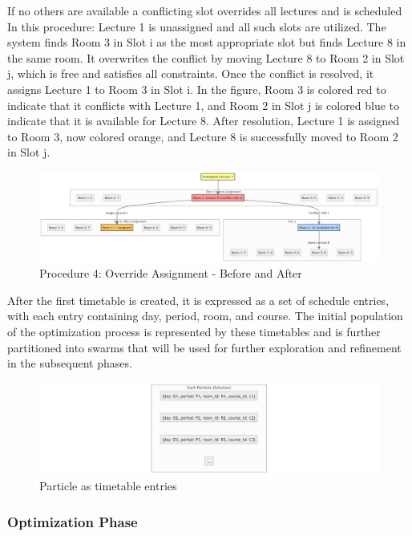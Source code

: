\begin{itemize}
    If no others are available a conflicting slot overrides all lectures and is scheduled In this procedure: Lecture 1 is unassigned and all such slots are utilized. The system finds Room 3 in Slot i as the most appropriate slot but finds Lecture 8 in the same room. It overwrites the conflict by moving Lecture 8 to Room 2 in Slot j, which is free and satisfies all constraints. Once the conflict is resolved, it assigns Lecture 1 to Room 3 in Slot i. In the figure, Room 3 is colored red to indicate that it conflicts with Lecture 1, and Room 2 in Slot j is colored blue to indicate that it is available for Lecture 8. After resolution, Lecture 1 is assigned to Room 3, now colored orange, and Lecture 8 is successfully moved to Room 2 in Slot j.

    \begin{figure}[H]
        \centering
        \includegraphics[width=1\textwidth]{procedure4_override_assignment.png}
        \caption{Procedure 4: Override Assignment - Before and After}
        \label{fig:override_assignment}
    \end{figure}

\end{itemize}

After the first timetable is created, it is expressed as a set of schedule entries, with each entry containing day, period, room, and course. The initial population of the optimization process is represented by these timetables and is further partitioned into swarms that will be used for further exploration and refinement in the subsequent phases.

\begin{figure}[H]
    \centering
    \includegraphics[width=1\textwidth]{timetable_particles.png} 
    \caption{Particle as timetable entries}
    \label{fig:timetable_particles}
\end{figure}\subsubsection{Optimization Phase}
\label{subsubsec:optimization}

